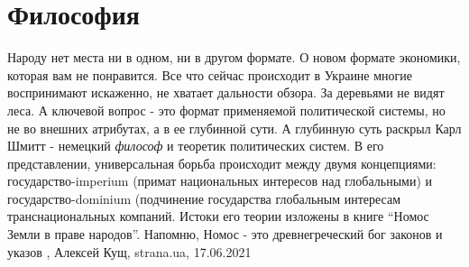 
 
 
 
 
\chapter{Философия}
\label{sec:slova.filosofia}

Народу нет места ни в одном, ни в другом формате.  О новом формате экономики,
которая вам не понравится.  Все что сейчас происходит в Украине многие
воспринимают искаженно, не хватает дальности обзора.  За деревьями не видят
леса.  А ключевой вопрос - это формат применяемой политической системы, но не
во внешних атрибутах, а в ее глубинной сути.  А глубинную суть раскрыл Карл
Шмитт - немецкий \emph{философ} и теоретик политических систем.  В его
представлении, универсальная борьба происходит между двумя концепциями:
государство-imperium (примат национальных интересов над глобальными) и
государство-dominium (подчинение государства глобальным интересам
транснациональных компаний.  Истоки его теории изложены в книге \enquote{Номос
Земли в праве народов}. Напомню, Номос - это древнегреческий бог законов и
указов
, 
Алексей Кущ, strana.ua, 17.06.2021

